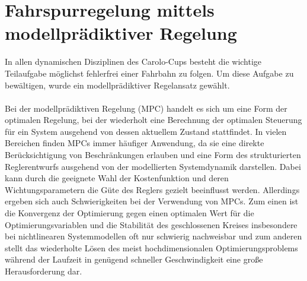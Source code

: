 \section{Fahrspurregelung mittels modellprädiktiver Regelung}
In allen dynamischen Disziplinen des Carolo-Cups besteht die wichtige Teilaufgabe möglichst fehlerfrei einer Fahrbahn zu folgen. Um diese Aufgabe zu bewältigen, wurde ein modellprädiktiver Regelansatz gewählt.\\ \\ 
Bei der modellprädiktiven Regelung (MPC) handelt es sich um eine Form der optimalen Regelung, bei der wiederholt eine Berechnung der optimalen Steuerung für ein System ausgehend von dessen aktuellem Zustand stattfindet. In vielen Bereichen finden MPCs immer häufiger Anwendung, da sie eine direkte Berücksichtigung von Beschränkungen erlauben und eine Form des strukturierten Reglerentwurfs ausgehend von der modellierten Systemdynamik darstellen. Dabei kann durch die geeignete Wahl der Kostenfunktion und deren Wichtungsparametern die Güte des Reglers gezielt beeinflusst werden. Allerdings ergeben sich auch Schwierigkeiten bei der Verwendung von MPCs. Zum einen ist die Konvergenz der Optimierung gegen einen optimalen Wert für die Optimierungsvariablen und die Stabilität des geschlossenen Kreises insbesondere bei nichtlinearen Systemmodellen oft nur schwierig nachweisbar und zum anderen stellt das wiederholte Lösen des meist hochdimensionalen Optimierungsproblems während der Laufzeit in genügend schneller Geschwindigkeit eine große Herausforderung dar.
\\
